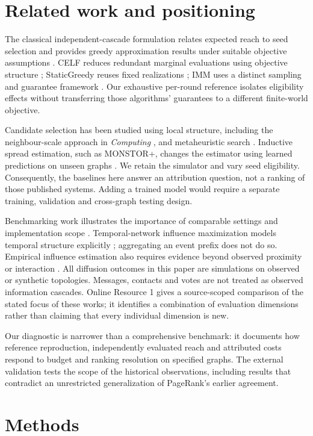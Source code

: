 \documentclass[smallextended]{svjour3}
\begin{document}
\section{Related work and positioning}
The classical independent-cascade formulation relates expected reach to seed selection and provides greedy approximation results under suitable objective assumptions \cite{ref1}. CELF reduces redundant marginal evaluations using objective structure \cite{ref7}; StaticGreedy reuses fixed realizations \cite{ref8}; IMM uses a distinct sampling and guarantee framework \cite{ref2}. Our exhaustive per-round reference isolates eligibility effects without transferring those algorithms' guarantees to a different finite-world objective.

Candidate selection has been studied using local structure, including the neighbour-scale approach in \emph{Computing} \cite{ref12}, and metaheuristic search \cite{ref13}. Inductive spread estimation, such as MONSTOR+, changes the estimator using learned predictions on unseen graphs \cite{ref19}. We retain the simulator and vary seed eligibility. Consequently, the baselines here answer an attribution question, not a ranking of those published systems. Adding a trained model would require a separate training, validation and cross-graph testing design.

Benchmarking work illustrates the importance of comparable settings and implementation scope \cite{ref16}. Temporal-network influence maximization models temporal structure explicitly \cite{ref11}; aggregating an event prefix does not do so. Empirical influence estimation also requires evidence beyond observed proximity or interaction \cite{ref15}. All diffusion outcomes in this paper are simulations on observed or synthetic topologies. Messages, contacts and votes are not treated as observed information cascades. Online Resource 1 gives a source-scoped comparison of the stated focus of these works; it identifies a combination of evaluation dimensions rather than claiming that every individual dimension is new.

Our diagnostic is narrower than a comprehensive benchmark: it documents how reference reproduction, independently evaluated reach and attributed costs respond to budget and ranking resolution on specified graphs. The external validation tests the scope of the historical observations, including results that contradict an unrestricted generalization of PageRank's earlier agreement.

\section{Methods}
\end{document}
